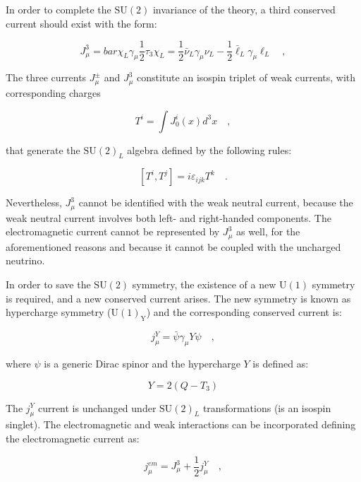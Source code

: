 In order to complete the $\mathrm{SU(2)}$ invariance of the theory, a third conserved current should exist with the form:

\begin{equation}
J_\mu^3 = bar{\chi}_L \gamma_\mu \dfrac{1}{2} \tau_3 \chi_L = \dfrac{1}{2}\bar{\nu}_L \gamma_\mu \nu_L -  \dfrac{1}{2}\bar{\ell}_L \gamma_\mu \ell_L \quad,
\end{equation}

The three currents $J_\mu^\pm$ and $J_\mu^3$ constitute an isospin triplet of weak currents, with corresponding charges

\begin{equation}
T^i = \int J_0^i(x)d^3x \quad,
\end{equation}

that generate the $\mathrm{SU(2)}_L$ algebra defined by the following rules:

\begin{equation}
\left[T^i, T^j \right] = i \varepsilon_{ijk} T^k \quad.
\end{equation}

Nevertheless, $J_\mu^3$ cannot be identified with the weak neutral current, because the weak neutral current involves both left- and right-handed components. The electromagnetic current cannot be represented by $J_\mu^3$ as well, for the aforementioned reasons and because it cannot be coupled with the uncharged neutrino.

In order to save the $\mathrm{SU(2)}$ symmetry, the existence of a new $\mathrm{U(1)}$ symmetry is required, and a new conserved current arises. The new symmetry is known as hypercharge symmetry ($\mathrm{U(1)_Y}$) and the corresponding conserved current is:

\begin{equation}
j_\mu^Y = \bar{\psi} \gamma_\mu Y \psi \quad,
\end{equation}

where $\psi$ is a generic Dirac spinor and the hypercharge $Y$ is defined as:

\begin{equation}
Y = 2(Q - T_3)
\end{equation}

The $j_\mu^Y$ current is unchanged under $\mathrm{SU(2)}_L$ transformations (is an isospin singlet). The electromagnetic and weak interactions can be incorporated defining the electromagnetic current as:

\begin{equation}
j_\mu^{em} = J_\mu^3 + \dfrac{1}{2} j_\mu^Y \quad,
\end{equation}

